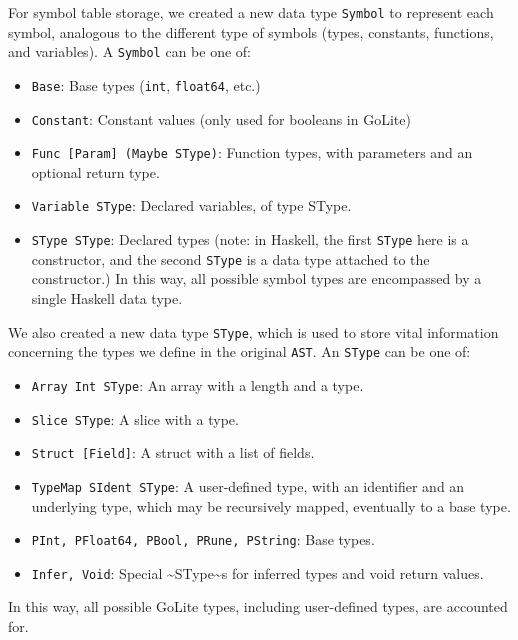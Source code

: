 \documentclass[11pt]{article}
\begin{document}
For symbol table storage, we created a new data type \texttt{Symbol} to
represent each symbol, analogous to the different type of symbols
(types, constants, functions, and variables). A \texttt{Symbol} can be one
of:
\begin{itemize}
	\item \texttt{Base}: Base types (\texttt{int}, \texttt{float64}, etc.)
	\item \texttt{Constant}: Constant values (only used for booleans in GoLite)
	\item \texttt{Func [Param] (Maybe SType)}: Function types, with parameters and an
	      optional return type.
	\item \texttt{Variable SType}: Declared variables, of type SType.
	\item \texttt{SType SType}: Declared types (note: in Haskell, the first \texttt{SType} here is
	      a constructor, and the second \texttt{SType} is a data type attached to
	      the constructor.)  In this way, all possible symbol types are
	      encompassed by a single Haskell data type.
\end{itemize}

We also created a new data type \texttt{SType}, which is used to store
vital information concerning the types we define in the original
\texttt{AST}.  An \texttt{SType} can be one of:
\begin{itemize}
	\item \texttt{Array Int SType}: An array with a length and a type.
	\item \texttt{Slice SType}: A slice with a type.
	\item \texttt{Struct [Field]}: A struct with a list of fields.
	\item \texttt{TypeMap SIdent SType}: A user-defined type, with an identifier and an
	      underlying type, which may be recursively mapped, eventually to a
	      base type.
	\item \texttt{PInt, PFloat64, PBool, PRune, PString}: Base types.
	\item \texttt{Infer, Void}: Special \textasciitilde{}SType\textasciitilde{}s for inferred types and void return values.
\end{itemize}
In this way, all possible GoLite types, including user-defined
types, are accounted for.
\end{document}

